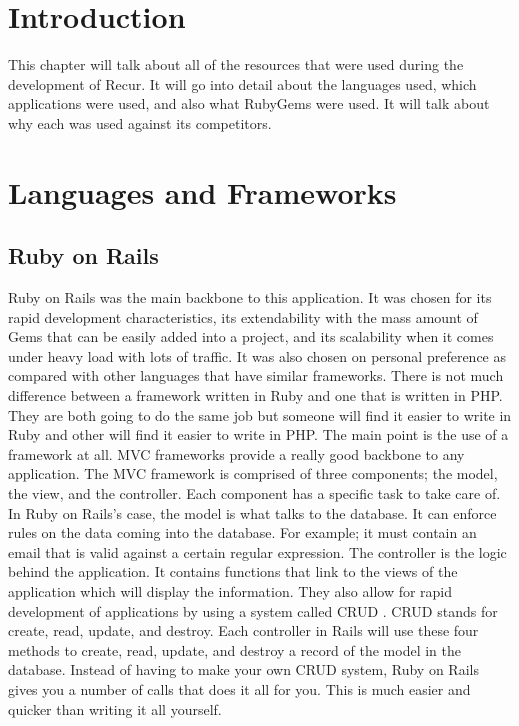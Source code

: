 \section{Introduction}
This chapter will talk about all of the resources that were used during the development of Recur. It will go into detail about the languages used, which applications were used, and also what RubyGems were used. It will talk about why each was used against its competitors.

\section{Languages and Frameworks}
\subsection{Ruby on Rails}
Ruby on Rails was the main backbone to this application. It was chosen for its rapid development characteristics, its extendability with the mass amount of Gems that can be easily added into a project, and its scalability when it comes under heavy load with lots of traffic. It was also chosen on personal preference as compared with other languages that have similar frameworks. There is not much difference between a framework written in Ruby and one that is written in PHP. They are both going to do the same job but someone will find it easier to write in Ruby and other will find it easier to write in PHP. The main point is the use of a framework at all. MVC frameworks provide a really good backbone to any application. The MVC framework is comprised of three components; the model, the view, and the controller. Each component has a specific task to take care of. In Ruby on Rails's case, the model is what talks to the database. It can enforce rules on the data coming into the database. For example; it must contain an email that is valid against a certain regular expression. The controller is the logic behind the application. It contains functions that link to the views of the application which will display the information. They also allow for rapid development of applications by using a system called CRUD . CRUD stands for create, read, update, and destroy. Each controller in Rails will use these four methods to create, read, update, and destroy a record of the model in the database. Instead of having to make your own CRUD system, Ruby on Rails gives you a number of calls that does it all for you. This is much easier and quicker than writing it all yourself.\\

